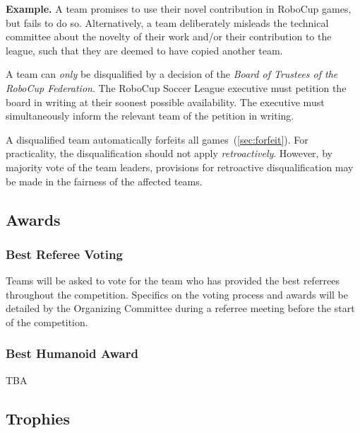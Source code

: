 \textbf{Example.} A team promises to use their novel contribution in RoboCup games, but fails to do so.
Alternatively, a team deliberately misleads the technical committee about the novelty of their work and/or their contribution to the league, such that they are deemed to have copied another team.

A team can \textit{only} be disqualified by a decision of the \textit{Board of Trustees of the RoboCup Federation}.
The RoboCup Soccer League executive must petition the board in writing at their soonest possible availability.
The executive must simultaneously inform the relevant team of the petition in writing.

A disqualified team automatically forfeits all games~(\cf \cref{sec:forfeit}).
For practicality, the disqualification should not apply \textit{retroactively}.
However, by majority vote of the team leaders, provisions for retroactive disqualification may be made in the fairness of the affected teams.

\subsection{Awards}
\label{awards}

\subsubsection{Best Referee Voting}

Teams will be asked to vote for the team who has provided the best referrees throughout the competition.
Specifics on the voting process and awards will be detailed by the Organizing Committee during a referree meeting before
the start of the competition.

\subsubsection{Best Humanoid Award}

TBA

\subsection{Trophies}
\label{trophies}

